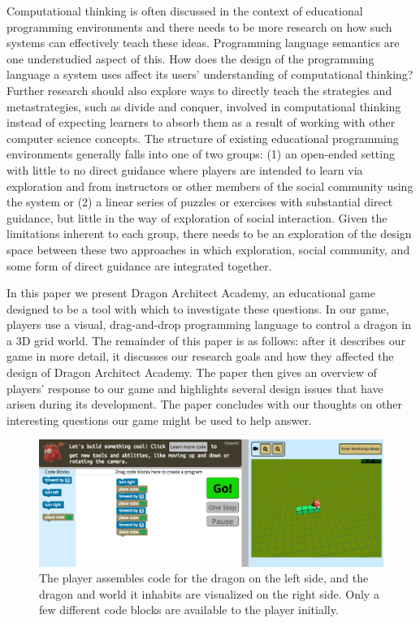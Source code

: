 \documentclass{sig-alternate}
\newcommand{\gametitle}{{\color{RoyalPurple} Dragon Architect Academy}}
\begin{document}
Computational thinking is often discussed in the context of educational programming environments and there needs to be more research on how such systems can effectively teach these ideas. 
Programming language semantics are one understudied aspect of this. 
How does the design of the programming language a system uses affect its users' understanding of computational thinking?
Further research should also explore ways to directly teach the strategies and metastrategies, such as divide and conquer, involved in computational thinking instead of expecting learners to absorb them as a result of working with other computer science concepts.
The structure of existing educational programming environments generally falls into one of two groups: (1) an open-ended setting with little to no direct guidance where players are intended to learn via exploration and from instructors or other members of the social community using the system or (2) a linear series of puzzles or exercises with substantial direct guidance, but little in the way of exploration of social interaction. 
Given the limitations inherent to each group, there needs to be an exploration of the design space between these two approaches in which exploration, social community, and some form of direct guidance are integrated together. 

In this paper we present \gametitle{}, an educational game designed to be a tool with which to investigate these questions. 
In our game, players use a visual, drag-and-drop programming language to control a dragon in a 3D grid world. 
The remainder of this paper is as follows: after it describes our game in more detail, it discusses our research goals and how they affected the design of \gametitle{}. 
The paper then gives an overview of players' response to our game and highlights several design issues that have arisen during its development.
The paper concludes with our thoughts on other interesting questions our game might be used to help answer.

\begin{figure}[t!]
  \centering
  \includegraphics[width=\textwidth]{images/overall-example}
  \caption{The player assembles code for the dragon on the left side, and the dragon and world it inhabits are visualized on the right side. Only a few different code blocks are available to the player initially.}
  \label{fig:overall}
\end{figure}
\end{document}
